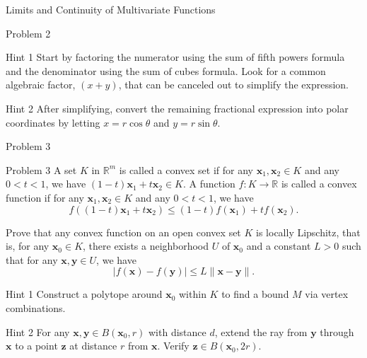 \documentclass{beamer}
\begin{document}
\begin{section}{Limits and Continuity of Multivariate Functions}
\begin{subsection}{Problem 2}
    \begin{frame}
        \begin{block}{Hint 1}
            Start by factoring the numerator using the sum of fifth powers formula and the denominator using the sum of cubes formula. Look for a common algebraic factor, $(x+y)$, that can be canceled out to simplify the expression.
        \end{block}

        \pause
        \vspace{2em}
        \begin{block}{Hint 2}
            After simplifying, convert the remaining fractional expression into polar coordinates by letting $x = r \cos \theta$ and $y = r \sin \theta$. 
        \end{block}
    \end{frame}
\end{subsection}

\begin{subsection}{Problem 3}
    \begin{frame}
        \begin{block}{Problem 3}
            A set $K$ in $\mathbb{R}^m$ is called a convex set if for any $\mathbf{x}_1, \mathbf{x}_2 \in K$ and any $0 < t < 1$, we have $(1-t)\mathbf{x}_1 + t\mathbf{x}_2 \in K$. A function $f: K \to \mathbb{R}$ is called a convex function if for any $\mathbf{x}_1, \mathbf{x}_2 \in K$ and any $0 < t < 1$, we have
            $$
            f((1-t)\mathbf{x}_1 + t\mathbf{x}_2) \le (1-t)f(\mathbf{x}_1) + tf(\mathbf{x}_2).
            $$

            Prove that any convex function on an open convex set $K$ is locally Lipschitz, that is, for any $\mathbf{x}_0 \in K$, there exists a neighborhood $U$ of $\mathbf{x}_0$ and a constant $L > 0$ such that for any $\mathbf{x}, \mathbf{y} \in U$, we have
            $$
            |f(\mathbf{x}) - f(\mathbf{y})| \le L\|\mathbf{x} - \mathbf{y}\|.
            $$
        \end{block}
    \end{frame}

    \begin{frame}
        \begin{block}{Hint 1}
            Construct a polytope around $\mathbf{x}_0$ within $K$ to find a bound $M$ via vertex combinations. 
        \end{block}

        \pause
        \vspace{2em}
        \begin{block}{Hint 2}
            For any $\mathbf{x}, \mathbf{y} \in B(\mathbf{x}_0, r)$ with distance $d$, extend the ray from $\mathbf{y}$ through $\mathbf{x}$ to a point $\mathbf{z}$ at distance $r$ from $\mathbf{x}$. Verify $\mathbf{z} \in B(\mathbf{x}_0, 2r)$.
        \end{block}


\end{frame}
\end{subsection}
\end{section}
\end{document}
